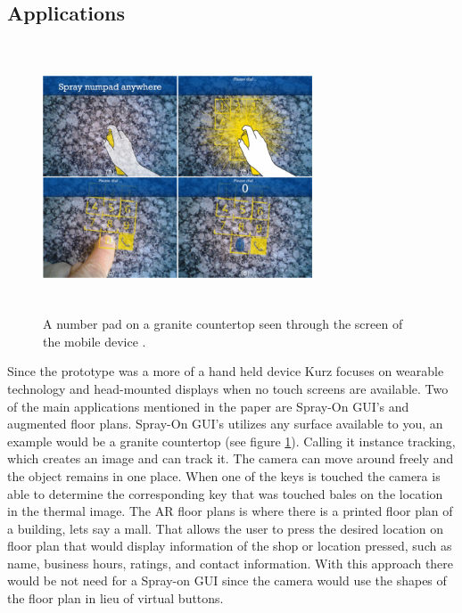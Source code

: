 \documentclass{sig-alternate}
\begin{document}
\subsection{Applications}
\label{Applications}

\begin{figure}
	\includegraphics[width=8cm, height=8cm]{numpad}
	\caption{A number pad on a granite countertop seen through the screen of the mobile device \cite{Thermal}.}
	\label{fig:numpad}
\end{figure}

Since the prototype was a more of a hand held device Kurz focuses on wearable technology and head-mounted displays when no touch screens are available. Two of the main applications mentioned in the paper are Spray-On GUI's and augmented floor plans. Spray-On GUI's utilizes any surface available to you, an example would be a granite countertop (see figure \ref{fig:numpad}). Calling it instance tracking, which creates an image and can track it. The camera can move around freely and the object remains in one place. When one of the keys is touched the camera is able to determine the corresponding key that was touched bales on the location in the thermal image. The AR floor plans is where there is a printed floor plan of a building, lets say a mall. That allows the user to press the desired location on floor plan that would display information of the shop or location pressed, such as name, business hours, ratings, and contact information. With this approach there would be not need for a Spray-on GUI since the camera would use the shapes of the floor plan in lieu of virtual buttons.          
\end{document}
